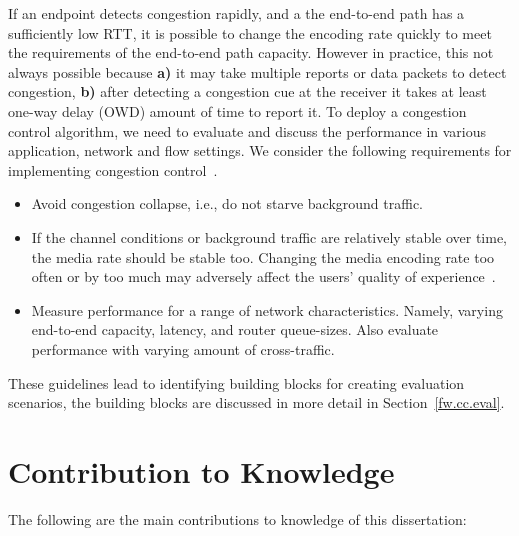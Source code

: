 If an endpoint detects congestion rapidly, and a the end-to-end path has a
sufficiently low RTT, it is possible to change the encoding rate quickly to
meet the requirements of the end-to-end path capacity. However in practice,
this not always possible because \textbf{a)} it may take multiple reports or
data packets to detect congestion, \textbf{b)} after detecting a congestion
cue at the receiver it takes at least one-way delay (OWD) amount of time to
report it. To deploy a congestion control algorithm, we need to evaluate and
discuss the performance in various application, network and flow settings. We
consider the following requirements for implementing congestion
control~\cite{draft.rmcat.evaluate}.

\begin{itemize}
\setlength{\itemsep}{0pt}

\item Avoid congestion collapse, i.e., do not starve background traffic.

\item If the channel conditions or background traffic are relatively stable
over time, the media rate should be stable too. Changing the media encoding
rate too often or by too much may adversely affect the users' quality of
experience~\cite{Zink03subjectiveimpression}.

\item Measure performance for a range of network characteristics. Namely,
varying end-to-end capacity, latency, and router queue-sizes. Also evaluate
performance with varying amount of cross-traffic.


\end{itemize}

These guidelines lead to identifying building blocks for creating evaluation
scenarios, the building blocks are discussed in more detail in
Section~\ref{fw.cc.eval}.


\section{Contribution to Knowledge}

The following are the main contributions to knowledge of this dissertation:

